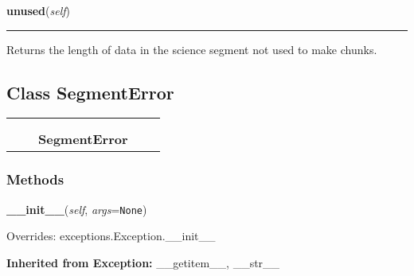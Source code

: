     \noindent\begin{boxedminipage}{\textwidth}

    \raggedright \textbf{unused}(\textit{self})

    \vspace{-1.5ex}

    \rule{\textwidth}{0.5\fboxrule}
    Returns the length of data in the science segment not used to make 
    chunks.

    \vspace{1ex}

    \end{boxedminipage}



\subsection{Class SegmentError}

    \label{pipeline:SegmentError}
\begin{tabular}{cccccc}
\multicolumn{2}{r}{\settowidth{\BCL}{exceptions.Exception}\multirow{2}{\BCL}{exceptions.Exception}}
&&
  \\\cline{3-3}
  &&\multicolumn{1}{c|}{}
&&
  \\
&&\multicolumn{2}{l}{\textbf{SegmentError}}
\end{tabular}



  \subsubsection{Methods}

    \label{pipeline:SegmentError:__init__}
    \vspace{0.5ex}

    \noindent\begin{boxedminipage}{\textwidth}

    \raggedright \textbf{\_\_init\_\_}(\textit{self}, \textit{args}=\texttt{N\-o\-n\-e\-})

      Overrides: exceptions.Exception.\_\_init\_\_

    \end{boxedminipage}

  \textbf{Inherited from Exception:}
    \_\_getitem\_\_,
    \_\_str\_\_

